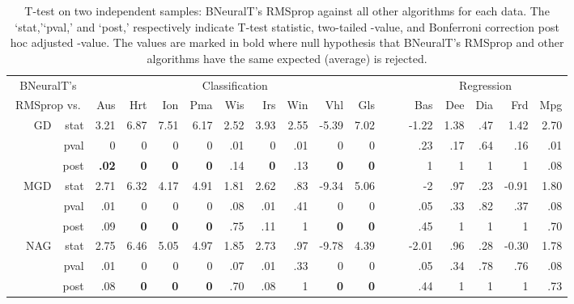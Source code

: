 \documentclass[11pt,a4paper]{article}
\begin{document}
    
    
    \begin{table} \small
        \centering
        \renewcommand{\arraystretch}{1.05}
        \setlength{\tabcolsep}{2pt}
        \caption{T-test on two independent samples: BNeuralT's RMSprop against all other algorithms for each data. The `stat,'`pval,' and `post,' respectively indicate T-test statistic, two-tailed -value, and Bonferroni correction post hoc adjusted -value. The values are marked in bold where null hypothesis that BNeuralT's RMSprop and other algorithms have the same expected (average) is rejected.}
        \label{tab:BNeuralT_RMSprop_VS_All_T_Test}
        \begin{tabular}[t]{lrrrrrrrrrrrrrrrrr}
            \toprule
            \multicolumn{3}{c}{BNeuralT's} & \multicolumn{9}{c}{Classification} & ~~ & \multicolumn{5}{c}{Regression} \\
            \cline{4-12}\cline{14-18}
            \multicolumn{3}{c}{RMSprop vs.}  & Aus & Hrt & Ion & Pma & Wis & Irs & Win & Vhl & Gls & ~ & Bas & Dee & Dia & Frd & Mpg \\
            \midrule
            \parbox[t]{3mm}{}
            & GD & stat & 3.21 & 6.87 & 7.51 & 6.17 & 2.52 & 3.93 & 2.55 & -5.39 & 7.02 &  & -1.22 & 1.38 & .47 & 1.42 & 2.70 \\
            &  & pval & 0 & 0 & 0 & 0 & .01 & 0 & .01 & 0 & 0 &  & .23 & .17 & .64 & .16 & .01 \\
            &  & post & \textbf{.02} & \textbf{0} & \textbf{0} & \textbf{0} & .14 & \textbf{0} & .13 & \textbf{0} & \textbf{0} &  & 1 & 1 & 1 & 1 & .08 \\
& MGD & stat & 2.71 & 6.32 & 4.17 & 4.91 & 1.81 & 2.62 & .83 & -9.34 & 5.06 &  & -2 & .97 & .23 & -0.91 & 1.80 \\
            &  & pval & .01 & 0 & 0 & 0 & .08 & .01 & .41 & 0 & 0 &  & .05 & .33 & .82 & .37 & .08 \\
            &  & post & .09 & \textbf{0} & \textbf{0} & \textbf{0} & .75 & .11 & 1 & \textbf{0} & \textbf{0} &  & .45 & 1 & 1 & 1 & .70 \\
& NAG & stat & 2.75 & 6.46 & 5.05 & 4.97 & 1.85 & 2.73 & .97 & -9.78 & 4.39 &  & -2.01 & .96 & .28 & -0.30 & 1.78 \\
            &  & pval & .01 & 0 & 0 & 0 & .07 & .01 & .33 & 0 & 0 &  & .05 & .34 & .78 & .76 & .08 \\
            &  & post & .08 & \textbf{0} & \textbf{0} & \textbf{0} & .70 & .08 & 1 & \textbf{0} & \textbf{0} &  & .44 & 1 & 1 & 1 & .73 \\

\end{tabular}
\end{table}
\end{document}
